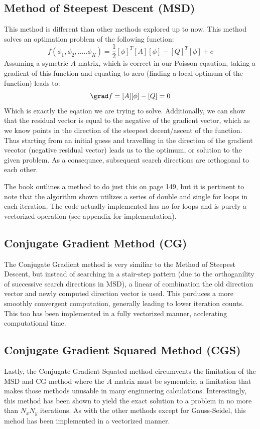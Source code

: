 \documentclass[11pt]{article}
\begin{document}
\subsection{Method of Steepest Descent (MSD)}
\label{sec-1-4}
This method is different than other methods explored up to now. This method solves an optimation problem of the following function:
\[
f(\phi_{1}, \phi_{2},..... \phi_{K}) = \frac{1}{2} [\phi]^{T} [A] [\phi] - [Q]^{T} [\phi] +c
\]
Assuming a symetric $A$ matrix, which is correct in our Poisson eqaution, taking a gradient of this function and equating to zero (finding a local optimum of the function)  leads to:
\[
\grad f = [A][\phi] - [Q] = 0
\]
Which is exactly the eqation we are trying to solve.
Additionally, we can show that the residual vector is equal to the negative of the gradient vector, which as we know points in the direction of the steepest decent/ascent of the function.  
Thus starting from an initial guess and travelling in the direction of the gradient vecotor (negative residual vector) leads us to the optimum, or solution to the given problem. As a consequnce, subsequent search directions are orthogonal to each other.

The book outlines a method to do just this on page 149, but it is pertinent to note that the algorithm shown utilizes a series of double and single for loops in each iteration. The code actually implemented has no for loops and is purely a vectorized operation (see appendix for implementation). 

\subsection{Conjugate Gradient Method (CG)}
\label{sec-1-5}
The Conjugate Gradient method  is very similiar to the Method of Steepest Descent, but instead of searching in a stair-step pattern (due to the orthoganility of successive search directions in MSD), a linear of combination the old direction vector and newly computed direction vector is used. This porduces a more smoothly convergent computation, generally leading to lower iteration counts. This too has been implemented in a fully vectorized manner, acclerating computational time.

\subsection{Conjugate Gradient Squared Method (CGS)}
\label{sec-1-6}
Lastly, the Conjugate Gradient Squated method circumvents the limitation of the MSD and CG method where the $A$ matrix must be symemtric, a limitation that makes those methods unusable in many enginnering calculations. Interestingly, this method has been shown to yield the exact solution to a problem in no more than $N_{x}N_{y}$ iterations. As with the other methods except for Gauss-Seidel, this mehod has been implemented in a vectorized manner. 
\end{document}
